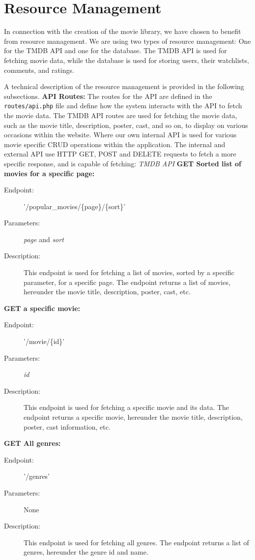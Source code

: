 \section{Resource Management}


In connection with the creation of the movie library, we have chosen to benefit from resource management.
We are using two types of resource management: One for the TMDB API and one for the database.
The TMDB API is used for fetching movie data, while the database is used for storing users, their watchlists, comments, and ratings.

A technical description of the resource management is provided in the following subsections.
\newline
\textbf{API Routes:}
The routes for the API are defined in the \texttt{routes/api.php} file and define how the system interacts with the API to fetch the movie data. The TMDB API routes are used for fetching the movie data, such as the movie title, description, poster, cast, and so on, to display on various occasions within the website. Where our own internal API is used for various movie specific CRUD operations within the application. 
The internal and external API use HTTP GET, POST and DELETE requests to fetch a more specific response, and is capable of fetching: \newline\newline
\textit{TMDB API} 
\textbf{\newline GET Sorted list of movies for a specific page:}
\begin{description}
    \item[Endpoint:] '/popular\_movies/\{page\}/\{sort\}'
    \item[Parameters:] \textit{page} and \textit{sort}
    \item[Description:] This endpoint is used for fetching a list of movies, sorted by a specific parameter, for a specific page. The endpoint returns a list of movies, hereunder the movie title, description, poster, cast, etc.
\end{description} 
\textbf{GET a specific movie:}
\begin{description}
    \item [Endpoint:] '/movie/\{id\}'
    \item [Parameters:] \textit{id}
    \item [Description:] This endpoint is used for fetching a specific movie and its data. The endpoint returns a specific movie, hereunder the movie title, description, poster, cast information, etc.
\end{description} 
\textbf{GET All genres:}
\begin{description}
    \item [Endpoint:] '/genres'
    \item [Parameters:] None
    \item [Description:] This endpoint is used for fetching all genres. The endpoint returns a list of genres, hereunder the genre id and name.
\end{description}


